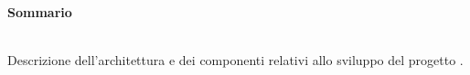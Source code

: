 \noindent\begin{Large}\textbf{Sommario}\end{Large}\\
\noindent
Descrizione dell'architettura e dei componenti relativi allo sviluppo del progetto \progetto{}.